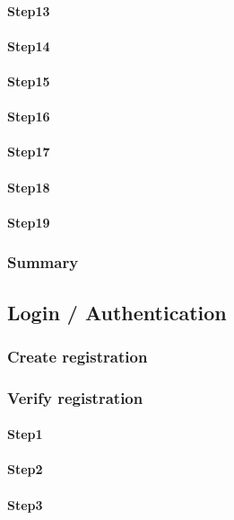 \documentclass[a4paper, 11pt]{scrartcl}
\begin{document}
\paragraph{Step13}
\paragraph{Step14}
\paragraph{Step15}
\paragraph{Step16}
\paragraph{Step17}
\paragraph{Step18}
\paragraph{Step19}

\subsubsection{Summary}

\subsection{Login / Authentication}

\subsubsection{Create registration}

\subsubsection{Verify registration}

\paragraph{Step1}
\paragraph{Step2}
\paragraph{Step3}
\end{document}
